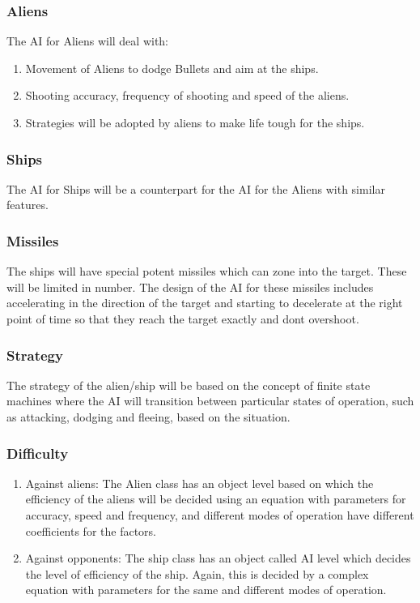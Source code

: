 \documentclass{article}
\begin{document}
				\subsubsection{Aliens}
					The AI for Aliens will deal with:
					\begin{enumerate}
						\item Movement of Aliens to dodge Bullets and aim at the ships.
						\item Shooting accuracy, frequency of shooting and speed of the aliens.
						\item Strategies will be adopted by aliens to make life tough for the ships.
					\end{enumerate}
				\subsubsection{Ships}
					The AI for Ships will be a counterpart for the AI for the Aliens with similar features.
				\subsubsection{Missiles}
					The ships will have special potent missiles which can zone into the target. These will be limited in number. The design of the AI for these missiles includes accelerating in the direction of the target and starting to decelerate at the right point of time so that they reach the target exactly and dont overshoot.  
				\subsubsection{Strategy}
					The strategy of the alien/ship will be based on the concept of finite state machines where the AI will transition between particular states of operation, such as attacking, dodging and fleeing, based on the situation.
				\subsubsection{Difficulty}
					\begin{enumerate}
						\item Against aliens: The Alien class has an object level based on which the efficiency of the aliens will be decided using an equation with parameters for accuracy, speed and frequency, and different modes of operation have different coefficients for the factors.
						\item Against opponents: The ship class has an object called AI level which decides the level of efficiency of the ship. Again, this is decided by a complex equation with parameters for the same and different modes of operation.
					\end{enumerate}
\end{document}
